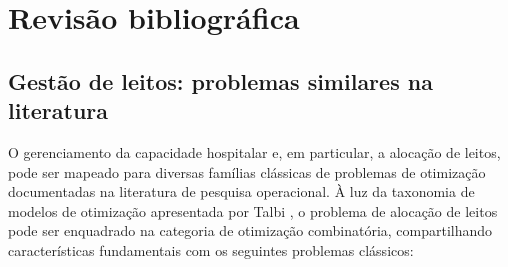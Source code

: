 \chapter{Revisão bibliográfica}
\label{cap:revisao}

\section{Gestão de leitos: problemas similares na literatura}

O gerenciamento da capacidade hospitalar e, em particular, a alocação de leitos, pode ser mapeado para diversas famílias clássicas de problemas de otimização documentadas na literatura de pesquisa operacional. À luz da taxonomia de modelos de otimização apresentada por Talbi \cite{talbi2009metaheuristics}, o problema de alocação de leitos pode ser enquadrado na categoria de otimização combinatória, compartilhando características fundamentais com os seguintes problemas clássicos:

